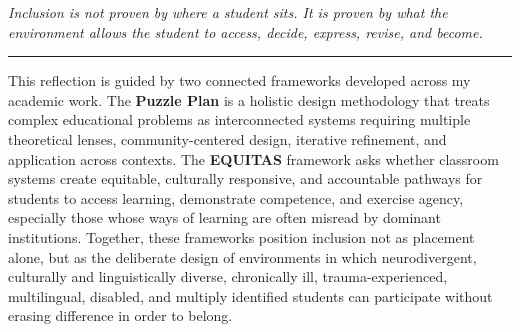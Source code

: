 \documentclass[11pt]{article}
\newcommand{\reviewsection}[1]{\vspace{0.07in}\noindent{\normalsize\bfseries\color{PrimaryRed}#1}\par\vspace{0.02in}}
\begin{document}
\begin{titlepage}
\vfill

\begin{center}
\begin{minipage}{0.92\textwidth}
\centering\itshape
Inclusion is not proven by where a student sits. It is proven by what the environment allows the student to access, decide, express, revise, and become.\\
{\color{PrimaryRed}\rule{4in}{0.8pt}}
\end{minipage}
\end{center}

\vfill

\begin{center}
\begin{minipage}{0.95\textwidth}
\small
This reflection is guided by two connected frameworks developed across my academic work. The \textbf{Puzzle Plan} is a holistic design methodology that treats complex educational problems as interconnected systems requiring multiple theoretical lenses, community-centered design, iterative refinement, and application across contexts. The \textbf{EQUITAS} framework asks whether classroom systems create equitable, culturally responsive, and accountable pathways for students to access learning, demonstrate competence, and exercise agency, especially those whose ways of learning are often misread by dominant institutions. Together, these frameworks position inclusion not as placement alone, but as the deliberate design of environments in which neurodivergent, culturally and linguistically diverse, chronically ill, trauma-experienced, multilingual, disabled, and multiply identified students can participate without erasing difference in order to belong.
\end{minipage}
\end{center}

\restoregeometry
\end{titlepage}

\reviewsection{Topics I Now Understand Well}
\end{document}
